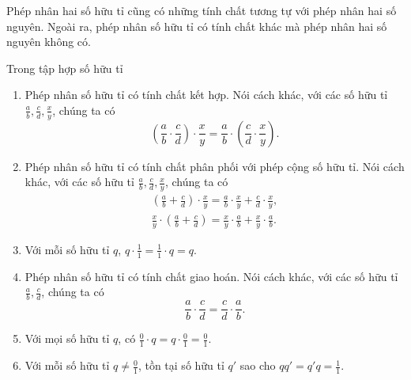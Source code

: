 Phép nhân hai số hữu tỉ cũng có những tính chất tương tự với phép nhân hai số nguyên. Ngoài ra, phép nhân số hữu tỉ có tính chất khác mà phép nhân hai số nguyên không có.
\begin{theorem}\label{theorem:property-of-rational-numbers-multiplication}
    Trong tập hợp số hữu tỉ
    \begin{enumerate}[label={(\roman*)}]
        \item Phép nhân số hữu tỉ có tính chất kết hợp. Nói cách khác, với các số hữu tỉ $\frac{a}{b}, \frac{c}{d}, \frac{x}{y}$, chúng ta có
              \[
                  \left(\frac{a}{b}\cdot\frac{c}{d}\right)\cdot\frac{x}{y} = \frac{a}{b}\cdot\left(\frac{c}{d}\cdot\frac{x}{y}\right).
              \]
        \item Phép nhân số hữu tỉ có tính chất phân phối với phép cộng số hữu tỉ. Nói cách khác, với các số hữu tỉ $\frac{a}{b}, \frac{c}{d}, \frac{x}{y}$, chúng ta có
              \[
                  \begin{split}
                      \left(\frac{a}{b} + \frac{c}{d}\right)\cdot\frac{x}{y} = \frac{a}{b}\cdot\frac{x}{y} + \frac{c}{d}\cdot\frac{x}{y}, \\
                      \frac{x}{y}\cdot\left(\frac{a}{b} + \frac{c}{d}\right) = \frac{x}{y}\cdot\frac{a}{b} + \frac{x}{y}\cdot\frac{a}{b}.
                  \end{split}
              \]
        \item Với mỗi số hữu tỉ $q$, $q\cdot \frac{1}{1} = \frac{1}{1}\cdot q = q$.
        \item Phép nhân số hữu tỉ có tính chất giao hoán. Nói cách khác, với các số hữu tỉ $\frac{a}{b}, \frac{c}{d}$, chúng ta có
              \[
                  \frac{a}{b}\cdot\frac{c}{d} = \frac{c}{d}\cdot\frac{a}{b}.
              \]
        \item Với mọi số hữu tỉ $q$, có $\frac{0}{1}\cdot q = q\cdot\frac{0}{1} = \frac{0}{1}$.
        \item Với mỗi số hữu tỉ $q\ne \frac{0}{1}$, tồn tại số hữu tỉ $q'$ sao cho $qq' = q'q = \frac{1}{1}$.
    \end{enumerate}
\end{theorem}

